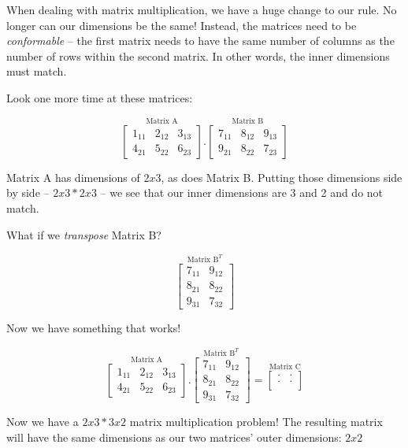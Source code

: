 \documentclass[
]{krantz}
\begin{document}
When dealing with matrix multiplication, we have a huge change to our
rule. No longer can our dimensions be the same! Instead, the matrices
need to be \emph{conformable} -- the first matrix needs to have the same
number of columns as the number of rows within the second matrix. In
other words, the inner dimensions must match.

Look one more time at these matrices:

\[
\stackrel{\mbox{Matrix A}}{
\begin{bmatrix}
1_{11} & 2_{12} & 3_{13}\\
4_{21} & 5_{22} & 6_{23}
\end{bmatrix}
}
.
\stackrel{\mbox{Matrix B}}{
\begin{bmatrix}
7_{11} & 8_{12} & 9_{13}\\
9_{21} & 8_{22} & 7_{23}
\end{bmatrix} 
}
\]

Matrix A has dimensions of \(2x3\), as does Matrix B. Putting those
dimensions side by side -- \(2x3 * 2x3\) -- we see that our inner
dimensions are 3 and 2 and do not match.

What if we \emph{transpose} Matrix B?

\[
\stackrel{\mbox{Matrix B}^T}{
\begin{bmatrix}
7_{11} & 9_{12} \\ 
8_{21}& 8_{22}\\
9_{31} & 7_{32}
\end{bmatrix} 
}
\]

Now we have something that works!

\[
\stackrel{\mbox{Matrix A}}{
\begin{bmatrix}
1_{11} & 2_{12} & 3_{13}\\
4_{21} & 5_{22} & 6_{23}
\end{bmatrix}
}
.
\stackrel{\mbox{Matrix B}^T}{
\begin{bmatrix}
7_{11} & 9_{12} \\ 
8_{21}& 8_{22}\\
9_{31} & 7_{32}
\end{bmatrix} 
}
=
\stackrel{\mbox{Matrix C}}{
\begin{bmatrix}
. & . \\
. & . \\
\end{bmatrix}
}
\]

Now we have a \(2x3 * 3x2\) matrix multiplication problem! The resulting
matrix will have the same dimensions as our two matrices' outer
dimensions: \(2x2\)
\end{document}
